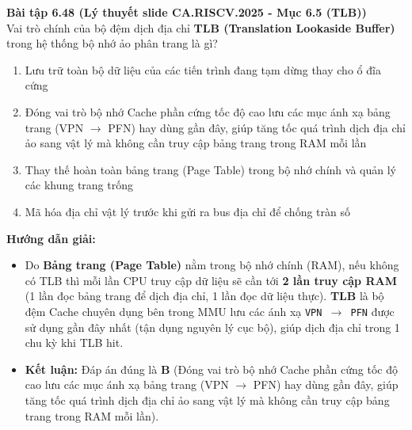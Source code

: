 \textbf{Bài tập 6.48 (Lý thuyết slide CA.RISCV.2025 - Mục 6.5 (TLB))}\\
Vai trò chính của bộ đệm dịch địa chỉ \textbf{TLB (Translation Lookaside Buffer)} trong hệ thống bộ nhớ ảo phân trang là gì?
\begin{enumerate}[label=\Alph*.]
    \item Lưu trữ toàn bộ dữ liệu của các tiến trình đang tạm dừng thay cho ổ đĩa cứng
    \item Đóng vai trò bộ nhớ Cache phần cứng tốc độ cao lưu các mục ánh xạ bảng trang (VPN $\rightarrow$ PFN) hay dùng gần đây, giúp tăng tốc quá trình dịch địa chỉ ảo sang vật lý mà không cần truy cập bảng trang trong RAM mỗi lần
    \item Thay thế hoàn toàn bảng trang (Page Table) trong bộ nhớ chính và quản lý các khung trang trống
    \item Mã hóa địa chỉ vật lý trước khi gửi ra bus địa chỉ để chống tràn số
\end{enumerate}
\textbf{Hướng dẫn giải:}
\begin{itemize}
    \item Do \textbf{Bảng trang (Page Table)} nằm trong bộ nhớ chính (RAM), nếu không có TLB thì mỗi lần CPU truy cập dữ liệu sẽ cần tới \textbf{2 lần truy cập RAM} (1 lần đọc bảng trang để dịch địa chỉ, 1 lần đọc dữ liệu thực). \textbf{TLB} là bộ đệm Cache chuyên dụng bên trong MMU lưu các ánh xạ \texttt{VPN $\rightarrow$ PFN} được sử dụng gần đây nhất (tận dụng nguyên lý cục bộ), giúp dịch địa chỉ trong 1 chu kỳ khi TLB hit.
    \item \textbf{Kết luận:} Đáp án đúng là \textbf{B} (Đóng vai trò bộ nhớ Cache phần cứng tốc độ cao lưu các mục ánh xạ bảng trang (VPN $\rightarrow$ PFN) hay dùng gần đây, giúp tăng tốc quá trình dịch địa chỉ ảo sang vật lý mà không cần truy cập bảng trang trong RAM mỗi lần).
\end{itemize}

